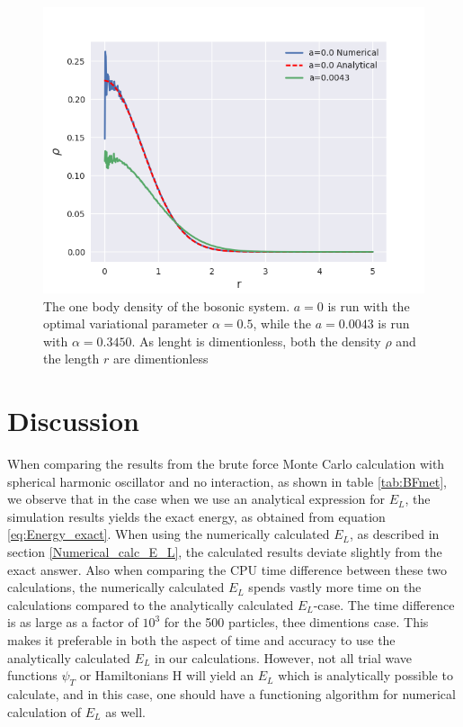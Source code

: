 \documentclass[norsk,a4paper,12pt]{article}
\begin{document}
\begin{figure} [H]
    \centering
    \includegraphics[scale=0.65]{images/ob.png}
    \caption{The one body density of the bosonic system. $a=0$ is run with the optimal variational parameter $\alpha = 0.5$, while the $a=0.0043$ is run with $\alpha = 0.3450$. As lenght is dimentionless, both the density $\rho$ and the length $r$ are dimentionless}
    \label{fig:ob0}
\end{figure}

\section{Discussion} \label{Discussion}

When comparing the results from the brute force Monte Carlo calculation with spherical harmonic oscillator and no interaction, as shown in table \ref{tab:BFmet}, we observe that in the case when we use an analytical expression for $E_L$, the simulation results yields the exact energy, as obtained from equation \ref{eq:Energy_exact}. When using the numerically calculated $E_L$, as described in section \ref{Numerical_calc_E_L}, the calculated results deviate slightly from the exact answer. Also when comparing the CPU time difference between these two calculations, the numerically calculated $E_L$ spends vastly more time on the calculations compared to the analytically calculated $E_L$-case. The time difference is as large as a factor of $10^3$ for the 500 particles, thee dimentions case. This makes it preferable in both the aspect of time and accuracy to use the analytically calculated $E_L$ in our calculations. However, not all trial wave functions $\psi_T$ or Hamiltonians H will yield an $E_L$ which is analytically possible to calculate, and in this case, one should have a functioning algorithm for numerical calculation of $E_L$ as well.
\par 
\vspace{3mm}
\end{document}
